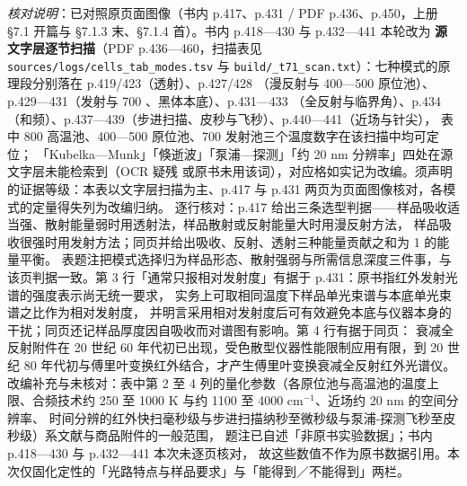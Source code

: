 \emph{核对说明}：已对照原页面图像（书内 p.417、p.431 / PDF p.436、p.450，上册
§7.1 开篇与 §7.1.3 末、§7.1.4 首）。书内 p.418—430 与 p.432—441 本轮改为
\textbf{源文字层逐节扫描}（PDF p.436—460，扫描表见 \texttt{sources/logs/cells\_tab\_modes.tsv}
与 \texttt{build/\_t71\_scan.txt}）：七种模式的原理段分别落在 p.419/423（透射）、p.427/428
（漫反射与 400—500 \degC 原位池）、p.429—431（发射与 700 \degC、黑体本底）、p.431—433
（全反射与临界角）、p.434（和频）、p.437—439（步进扫描、皮秒与飞秒）、p.440—441（近场与针尖），
表中 800 \degC 高温池、400—500 \degC 原位池、700 \degC 发射池三个温度数字在该扫描中均可定位；
「Kubelka—Munk」「倏逝波」「泵浦—探测」「约 20 nm 分辨率」四处在源文字层未能检索到（OCR 疑残
或原书未用该词），对应格如实记为改编。须声明的证据等级：本表以文字层扫描为主、p.417 与
p.431 两页为页面图像核对，各模式的定量得失列为改编归纳。
逐行核对：p.417 给出三条选型判据——样品吸收适当强、散射能量弱时用透射法，样品散射或反射能量大时用漫反射方法，
样品吸收很强时用发射方法；同页并给出吸收、反射、透射三种能量贡献之和为 1 的能量平衡。
表题注把模式选择归为样品形态、散射强弱与所需信息深度三件事，与该页判据一致。第 3 行「通常只报相对发射度」有据于
p.431：原书指红外发射光谱的强度表示尚无统一要求，
实务上可取相同温度下样品单光束谱与本底单光束谱之比作为相对发射度，
并明言采用相对发射度后可有效避免本底与仪器本身的干扰；同页还记样品厚度因自吸收而对谱图有影响。第 4 行有据于同页：
衰减全反射附件在 20 世纪 60 年代初已出现，受色散型仪器性能限制应用有限，到 20 世纪 80
年代初与傅里叶变换红外结合，才产生傅里叶变换衰减全反射红外光谱仪。
改编补充与未核对：表中第 2 至 4 列的量化参数（各原位池与高温池的温度上限、合频技术约 250 至 1000
K 与约 1100 至 4000 cm$^{-1}$、近场约 20 nm 的空间分辨率、
时间分辨的红外快扫毫秒级与步进扫描纳秒至微秒级与泵浦-探测飞秒至皮秒级）系文献与商品附件的一般范围，
题注已自述「非原书实验数据」；书内 p.418—430 与 p.432—441 本次未逐页核对，
故这些数值不作为原书数据引用。本次仅固化定性的「光路特点与样品要求」与「能得到／不能得到」两栏。


